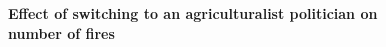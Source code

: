 \documentclass[12pt]{article}
\begin{document}
{%

  
\begin{figure}[hbtp!]
    \centering
    \caption{\textbf{Effect of switching to an agriculturalist politician on number of fires}}
    \label{fig:main_agri}
    

\end{figure}}
\end{document}
